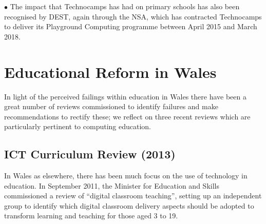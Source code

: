 \documentclass{sig-alternate}
\begin{document}
\noindent \textbf{$\bullet$}
The impact that Technocamps has had on primary schools has also been
recognised by DEST, again through the NSA, which has contracted
Technocamps to deliver its Playground Computing programme between
April 2015 and March 2018.

%
\section{Educational Reform in Wales}\label{welshedurefom}

In light of the perceived failings within education in
Wales there have been a great number of reviews commissioned to
identify failures and make recommendations to rectify these; we
reflect on three recent reviews which are particularly pertinent to
computing education.

\subsection{ICT Curriculum Review (2013)}



In Wales as elsewhere, there has been much focus on the use of
technology in education. In September 2011, the Minister for Education
and Skills commissioned a review of ``digital classroom teaching'',
setting up an independent group to identify which digital classroom
delivery aspects should be adopted to transform learning and teaching
for those aged 3 to 19.

\end{document}
